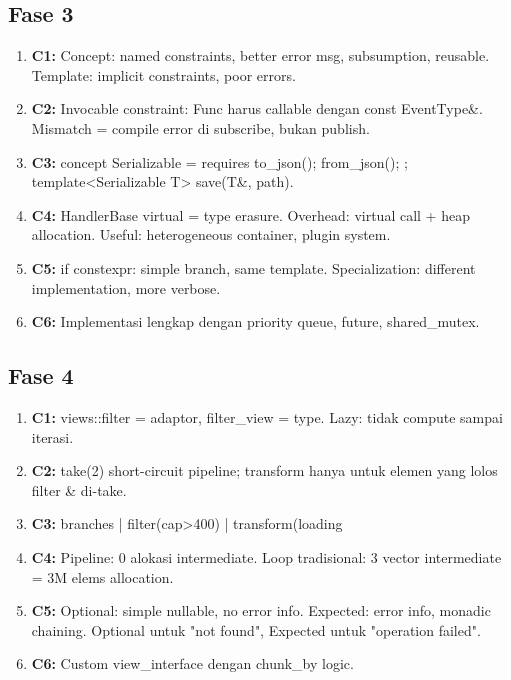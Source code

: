 \documentclass[12pt,a4paper]{article}
\begin{document}
\subsection*{Fase 3}
\begin{enumerate}
  \item \textbf{C1:} Concept: named constraints, better error msg, subsumption, reusable. Template: implicit constraints, poor errors.
  \item \textbf{C2:} Invocable constraint: Func harus callable dengan const EventType&. Mismatch = compile error di subscribe, bukan publish.
  \item \textbf{C3:} concept Serializable = requires { to_json(); from_json(); }; template<Serializable T> save(T&, path).
  \item \textbf{C4:} HandlerBase virtual = type erasure. Overhead: virtual call + heap allocation. Useful: heterogeneous container, plugin system.
  \item \textbf{C5:} if constexpr: simple branch, same template. Specialization: different implementation, more verbose.
  \item \textbf{C6:} Implementasi lengkap dengan priority queue, future, shared_mutex.
\end{enumerate}

\subsection*{Fase 4}
\begin{enumerate}
  \item \textbf{C1:} views::filter = adaptor, filter_view = type. Lazy: tidak compute sampai iterasi.
  \item \textbf{C2:} take(2) short-circuit pipeline; transform hanya untuk elemen yang lolos filter & di-take.
  \item \textbf{C3:} branches | filter(cap>400) | transform(loading%
  \item \textbf{C4:} Pipeline: 0 alokasi intermediate. Loop tradisional: 3 vector intermediate = 3M elems allocation.
  \item \textbf{C5:} Optional: simple nullable, no error info. Expected: error info, monadic chaining. Optional untuk "not found", Expected untuk "operation failed".
  \item \textbf{C6:} Custom view_interface dengan chunk_by logic.
\end{enumerate}
\end{document}
